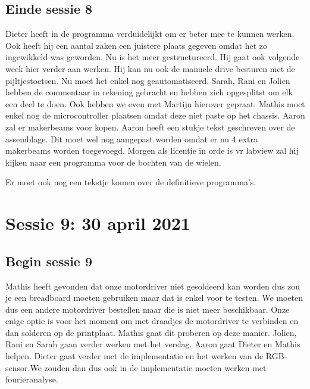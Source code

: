 \documentclass[a4paper,twoside,kulak]{kulakreport} %
\begin{document}
\section{Einde sessie 8}
Dieter heeft in de programma verduidelijkt om er beter mee te kunnen werken. Ook heeft hij een aantal zaken een juistere plaats gegeven omdat het zo ingewikkeld was geworden. Nu is het meer gestructureerd. Hij gaat ook volgende week hier verder aan werken. Hij kan nu ook de manuele drive besturen met de pijltjestoetsen. Nu moet het enkel nog geautomatiseerd.
Sarah, Rani en Jolien hebben de commentaar in rekening gebracht en hebben zich opgesplitst om elk een deel te doen. Ook hebben we even met Martijn hierover gepraat.
Mathis moet enkel nog de microcontroller plaatsen omdat deze niet paste op het chassis. Aaron zal er makerbeams voor kopen. 
Aaron heeft een stukje tekst geschreven over de assemblage. Dit  moet wel nog aangepast worden omdat er nu 4 extra makerbeams worden toegevoegd. Morgen als licentie in orde is vr labview zal hij kijken naar een programma voor de bochten van de wielen.

Er moet ook nog een tekstje komen over de definitieve programma's.

\chapter{Sessie 9: 30 april 2021}
\section{Begin sessie 9}
Mathis heeft gevonden dat onze motordriver niet gesoldeerd kan worden dus zou je een breadboard moeten gebruiken maar dat is enkel voor te testen.
We moeten dus een andere motordriver bestellen maar die is niet meer beschikbaar. Onze enige optie is voor het moment om met draadjes de motordriver te verbinden en dan solderen op de printplaat. Mathis gaat dit proberen op deze manier. Jolien, Rani en Sarah gaan verder werken met het verslag. Aaron gaat Dieter en Mathis helpen. Dieter gaat verder met de implementatie en het werken van de RGB-sensor.We zouden dan dus ook in de implementatie moeten werken met fourieranalyse.
\end{document}
